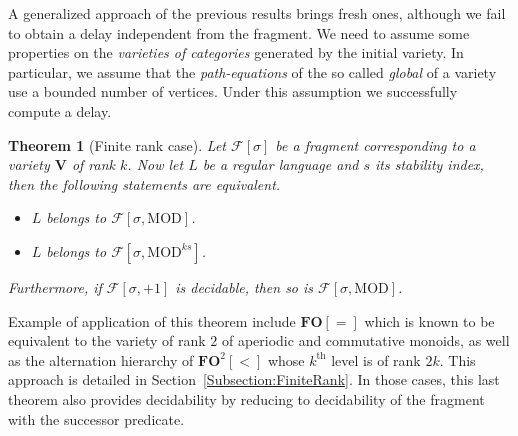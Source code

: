 \documentclass[submission,hidelink]{dmtcs-episciences}
\newtheorem{theorem}{Theorem}
\newcommand{\V}{\mathbf{V}}
\newcommand{\cF}{\mathcal{F}}
\newcommand{\FO}{\mathbf{FO}}
\newcommand{\MOD}{\mathrm{MOD}}
\begin{document}
A generalized approach of the previous results brings fresh ones, although we fail to obtain a delay independent from the fragment.
We need to assume some properties on the \emph{varieties of categories} generated by the initial variety. In particular, we assume
that the \emph{path-equations} of the so called \emph{global} of a variety use a bounded number of vertices. Under this assumption we successfully compute a delay.
\begin{theorem}[Finite rank case]\label{Main:finiterank}
Let $\cF[\sigma]$ be a fragment corresponding to a variety $\V$ of rank $k$.
Now let $L$ be a regular language and $s$ its stability index, then the following statements are equivalent.
\begin{itemize}
	\item  $L$ belongs to $\cF[\sigma, \MOD]$.
	\item  $L$ belongs to $\cF[\sigma,\MOD^{ks}]$.
\end{itemize}
Furthermore, if $\cF[\sigma,+1]$ is decidable, then so is $\cF[\sigma,\MOD]$.
\end{theorem}
Example of application of this theorem include $\FO[=]$ which is known to be equivalent to the variety of rank $2$ of aperiodic and
commutative monoids, as well as the alternation hierarchy of $\FO^2[<]$ whose $k^\text{th}$ level is of rank $2k$. This approach is detailed in Section~\ref{Subsection:FiniteRank}. In those cases, this last theorem also provides decidability by reducing to decidability of
the fragment with the successor predicate.
\end{document}
